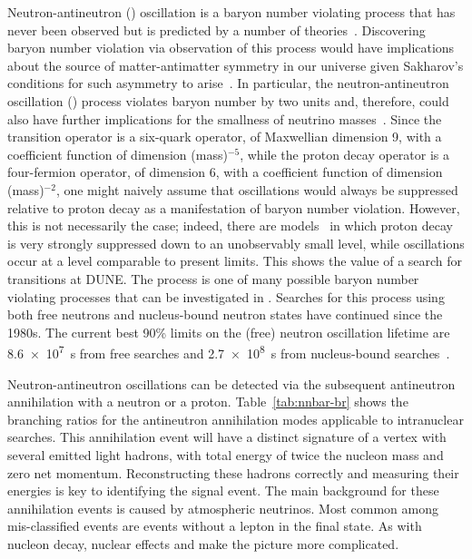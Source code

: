 Neutron-antineutron (\nnbar) oscillation is a baryon number violating process that
has never been observed but is predicted by a number of  theories~\cite{Phillips:2014fgb}. 
Discovering baryon
number violation via observation of this process would have implications about the source of matter-antimatter
symmetry in our universe given Sakharov's conditions for such asymmetry to arise~\cite{Sakharov:1967dj}.
In particular, the neutron-antineutron oscillation (\nnbar) process violates
baryon number by two units and, therefore, could also have further implications for
the smallness of neutrino masses~\cite{Phillips:2014fgb}. 
Since the \nnbar transition operator is a six-quark operator, of Maxwellian dimension \num{9}, with a coefficient function of dimension (mass)$^{-5}$, while the proton decay operator is a four-fermion operator, of dimension \num{6}, with a coefficient function of dimension (mass)$^{-2}$, one might naively assume that \nnbar oscillations would always be suppressed relative
to proton decay as a manifestation of baryon number violation.  However, this is not necessarily the case; indeed, there are models~\cite{Nussinov:2001rb} in which proton decay is very strongly suppressed down to an unobservably small level, while \nnbar oscillations occur at a level comparable to present limits. This shows the
value of a search for \nnbar transitions at DUNE.
The \nnbar process is one of many possible baryon number violating processes that can be investigated in . Searches for this process using
both free neutrons and nucleus-bound neutron states have continued 
since the 1980s. The current best \num{90}\%  limits on the (free) neutron oscillation lifetime are \SI{8.6e7}{\s} from free \nnbar searches and \SI{2.7e8}{\s} from nucleus-bound \nnbar searches~\cite{BaldoCeolin:1994jz,Abe:2011ky}.

Neutron-antineutron oscillations can be detected via the subsequent antineutron annihilation with a neutron or a proton. Table~\ref{tab:nnbar-br} shows the branching ratios for the antineutron annihilation modes applicable to intranuclear searches.  This annihilation event will have a distinct signature of a vertex with several emitted light hadrons, with total energy of twice the nucleon mass and zero net momentum. Reconstructing these hadrons correctly and measuring their energies is key to identifying the signal event. The main background for these \nnbar annihilation events is caused by atmospheric neutrinos. Most common among mis-classified events are   events without a lepton in the final state. As with nucleon decay, nuclear effects and  make the picture more complicated.



